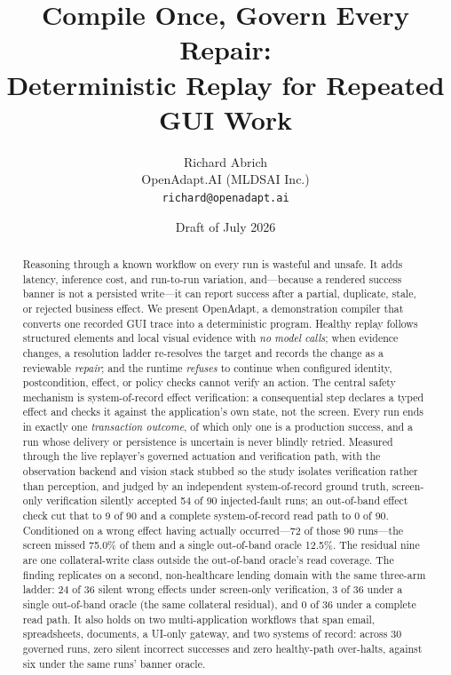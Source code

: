 \documentclass[10pt]{article}
\title{Compile Once, Govern Every Repair:\\Deterministic Replay for Repeated GUI Work}
\author{Richard Abrich\\OpenAdapt.AI (MLDSAI Inc.)\\\texttt{richard@openadapt.ai}}
\date{Draft of July 2026}
\newcommand{\system}{OpenAdapt}
\begin{document}
\maketitle

\begin{abstract}
Reasoning through a known workflow on every run is wasteful and unsafe. It adds
latency, inference cost, and run-to-run variation, and---because a rendered
success banner is not a persisted write---it can report success after a partial,
duplicate, stale, or rejected business effect. We present \system{}, a
demonstration compiler that converts one recorded GUI trace into a deterministic
program. Healthy replay follows structured elements and local visual evidence
with \emph{no model calls}; when evidence changes, a resolution ladder
re-resolves the target and records the change as a reviewable \emph{repair}; and
the runtime \emph{refuses} to continue when configured identity, postcondition,
effect, or policy checks cannot verify an action. The central safety mechanism is
system-of-record effect verification: a consequential step declares a typed
effect and checks it against the application's own state, not the screen. Every
run ends in exactly one \emph{transaction outcome}, of which only one is a
production success, and a run whose delivery or persistence is uncertain is
never blindly retried.
Measured through the live replayer's governed actuation and verification path,
with the observation backend and vision stack stubbed so the study isolates
verification rather than perception, and judged by an independent
system-of-record ground truth, screen-only verification silently accepted 54 of
90 injected-fault runs; an out-of-band effect check cut that to 9 of 90 and a
complete system-of-record read path to 0 of 90. Conditioned on a wrong effect
having actually occurred---72 of those 90 runs---the screen missed 75.0\% of
them and a single out-of-band oracle 12.5\%. The residual nine are one
collateral-write class outside the out-of-band oracle's read coverage. The
finding replicates on a second, non-healthcare lending domain with the same
three-arm ladder: 24 of 36 silent wrong effects under screen-only verification,
3 of 36 under a single out-of-band oracle (the same collateral residual), and
0 of 36 under a complete read path. It also holds on two multi-application
workflows that span email, spreadsheets, documents, a UI-only gateway, and two
systems of record: across 30 governed runs, zero silent incorrect successes and
zero healthy-path over-halts, against six under the same runs' banner oracle.

\end{abstract}
\end{document}
